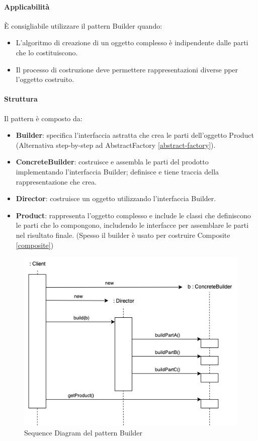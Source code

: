 \paragraph{Applicabilità} È consigliabile utilizzare il pattern Builder quando:
\begin{itemize}
    \item L'algoritmo di creazione di un oggetto complesso è indipendente dalle parti che lo costituiscono.
    \item Il processo di costruzione deve permettere rappresentazioni diverse pper l'oggetto costruito.
\end{itemize}

\paragraph{Struttura} Il pattern è composto da:
\begin{itemize}
    \item \textbf{Builder}: specifica l’interfaccia astratta che crea le parti dell’oggetto Product (Alternativa step-by-step ad AbstractFactory \ref{abstract-factory}). 
    \item \textbf{ConcreteBuilder}: costruisce e assembla le parti del prodotto implementando l’interfaccia Builder; definisce e tiene traccia della rappresentazione che crea.
    \item \textbf{Director}: costruisce un oggetto utilizzando l’interfaccia Builder.
    \item \textbf{Product}: rappresenta l’oggetto complesso e include le classi che definiscono le parti che lo compongono, includendo le interfacce per assemblare le parti nel risultato finale. (Spesso il builder è usato per costruire Composite \ref{composite})
\end{itemize}

\begin{figure}[H]
    \centering
    \includegraphics[width=0.75\linewidth]{assets/pattern/builder/builder-sequence.drawio.png}
    \caption{Sequence Diagram del pattern Builder}
\end{figure}

